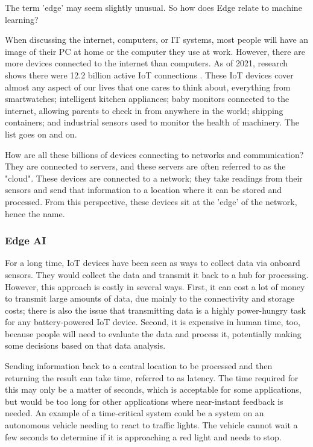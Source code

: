 \documentclass[conference]{IEEEtran}
\begin{document}
The term 'edge' may seem slightly unusual. So how does Edge relate to machine learning? 

When discussing the internet, computers, or IT systems, most people will have an image of their PC at home or the computer they use at work. However, there are more devices connected to the internet than computers. As of 2021, research shows there were 12.2 billion active IoT connections \cite{b3}. These IoT devices cover almost any aspect of our lives that one cares to think about, everything from smartwatches; intelligent kitchen appliances; baby monitors connected to the internet, allowing parents to check in from anywhere in the world; shipping containers; and industrial sensors used to monitor the health of machinery. The list goes on and on.

How are all these billions of devices connecting to networks and communication? They are connected to servers, and these servers are often referred to as the "cloud".
These devices are connected to a network; they take readings from their sensors and send that information to a location where it can be stored and processed. From this perspective, these devices sit at the 'edge' of the network, hence the name.

\subsubsection{Edge AI}
For a long time, IoT devices have been seen as ways to collect data via onboard sensors. They would collect the data and transmit it back to a hub for processing. However, this approach is costly in several ways. First, it can cost a lot of money to transmit large amounts of data, due mainly to the connectivity and storage costs; there is also the issue that transmitting data is a highly power-hungry task for any battery-powered IoT device. Second, it is expensive in human time, too, because people will need to evaluate the data and process it, potentially making some decisions based on that data analysis.

Sending information back to a central location to be processed and then returning the result can take time, referred to as latency. The time required for this may only be a matter of seconds, which is acceptable for some applications, but would be too long for other applications where near-instant feedback is needed. An example of a time-critical system could be a system on an autonomous vehicle needing to react to traffic lights. The vehicle cannot wait a few seconds to determine if it is approaching a red light and needs to stop. 
\end{document}

